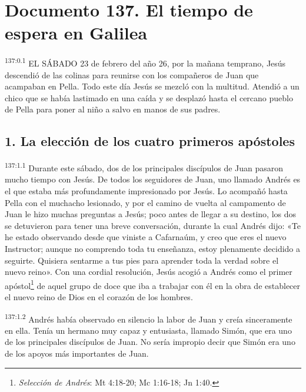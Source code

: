 \chapter{Documento 137. El tiempo de espera en Galilea}
\par 
\textsuperscript{137:0.1} EL SÁBADO 23 de febrero del año 26, por la mañana temprano, Jesús descendió de las colinas para reunirse con los compañeros de Juan que acampaban en Pella. Todo este día Jesús se mezcló con la multitud. Atendió a un chico que se había lastimado en una caída y se desplazó hasta el cercano pueblo de Pella para poner al niño a salvo en manos de sus padres.

\section*{1. La elección de los cuatro primeros apóstoles}
\par 
\textsuperscript{137:1.1} Durante este sábado, dos de los principales discípulos de Juan pasaron mucho tiempo con Jesús. De todos los seguidores de Juan, uno llamado Andrés es el que estaba más profundamente impresionado por Jesús. Lo acompañó hasta Pella con el muchacho lesionado, y por el camino de vuelta al campamento de Juan le hizo muchas preguntas a Jesús; poco antes de llegar a su destino, los dos se detuvieron para tener una breve conversación, durante la cual Andrés dijo: «Te he estado observando desde que viniste a Cafarnaúm, y creo que eres el nuevo Instructor; aunque no comprendo toda tu enseñanza, estoy plenamente decidido a seguirte. Quisiera sentarme a tus pies para aprender toda la verdad sobre el nuevo reino». Con una cordial resolución, Jesús acogió a Andrés como el primer apóstol\footnote{\textit{Selección de Andrés}: Mt 4:18-20; Mc 1:16-18; Jn 1:40.} de aquel grupo de doce que iba a trabajar con él en la obra de establecer el nuevo reino de Dios en el corazón de los hombres.

\par 
\textsuperscript{137:1.2} Andrés había observado en silencio la labor de Juan y creía sinceramente en ella. Tenía un hermano muy capaz y entusiasta, llamado Simón, que era uno de los principales discípulos de Juan. No sería impropio decir que Simón era uno de los apoyos más importantes de Juan.

